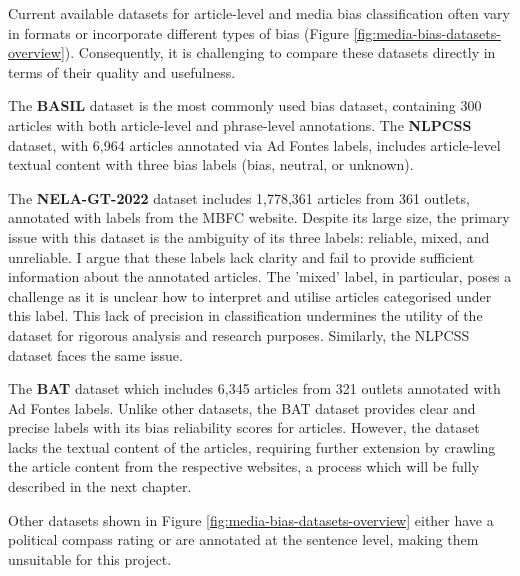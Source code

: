 Current available datasets for article-level and media bias classification often vary in formats or incorporate different types of bias \cite{rodrigo-2024-systematic-review-media-bias} (Figure \ref{fig:media-bias-datasets-overview}). Consequently, it is challenging to compare these datasets directly in terms of their quality and usefulness.

The \textbf{BASIL} dataset \cite{fan-2019-basil} is the most commonly used bias dataset, containing 300 articles with both article-level and phrase-level annotations. The \textbf{NLPCSS} \cite{chen-2020-nlpcss} dataset, with 6,964 articles annotated via Ad Fontes labels, includes article-level textual content with three bias labels (bias, neutral, or unknown).

The \textbf{NELA-GT-2022} dataset \cite{gruppi-2023-nela-gt-2022} includes 1,778,361 articles from 361 outlets, annotated with labels from the MBFC \cite{mbfc} website. Despite its large size, the primary issue with this dataset is the ambiguity of its three labels: reliable, mixed, and unreliable. I argue that these labels lack clarity and fail to provide sufficient information about the annotated articles. The 'mixed' label, in particular, poses a challenge as it is unclear how to interpret and utilise articles categorised under this label. This lack of precision in classification undermines the utility of the dataset for rigorous analysis and research purposes. Similarly, the NLPCSS dataset faces the same issue.

The \textbf{BAT} dataset \cite{spinde-2023-bat} which includes 6,345 articles from 321 outlets annotated with Ad Fontes labels. Unlike other datasets, the BAT dataset provides clear and precise labels with its bias reliability scores for articles. However, the dataset lacks the textual content of the articles, requiring further extension by crawling the article content from the respective websites, a process which will be fully described in the next chapter.

Other datasets shown in Figure \ref{fig:media-bias-datasets-overview} either have a political compass rating or are annotated at the sentence level, making them unsuitable for this project.

